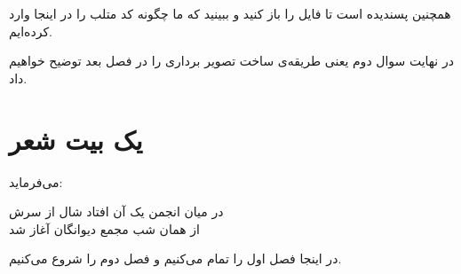 همچنین پسندیده است تا فایل  را باز کنید و ببینید که ما چگونه کد متلب را در اینجا وارد کرده‌ایم.

در نهایت سوال دوم یعنی طریقه‌ی ساخت تصویر برداری را در فصل بعد توضیح خواهیم داد.

\section{یک بیت شعر}
می‌فرماید:
\begin{center}
در میان انجمن یک آن افتاد شال از سرش\\
از همان شب مجمع دیوانگان آغاز شد
\end{center}
در اینجا فصل اول را تمام می‌کنیم و فصل دوم را شروع می‌کنیم.